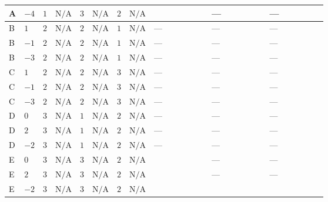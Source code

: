 \documentclass[8pt]{article}
\begin{document}
\begin{landscape}
\begin{longtable}{@{}llcccccc >{\raggedright\arraybackslash}p{0.21\linewidth} >{\raggedright\arraybackslash}p{0.21\linewidth} >{\raggedright\arraybackslash}p{0.21\linewidth}@{}}
\midrule
A & $-4$ & $1$ & $\text{N/A}$ & $3$ & $\text{N/A}$ & $2$ & $\text{N/A}$ & \scriptsize\adjustbox{max width=\linewidth}{$\begin{gathered} +16 {\lambda_{S_2}^{(A)}}^2\end{gathered}$} & --- & --- \\
\midrule
B & $1$ & $2$ & $\text{N/A}$ & $2$ & $\text{N/A}$ & $1$ & $\text{N/A}$ & --- & --- & --- \\
\midrule
B & $-1$ & $2$ & $\text{N/A}$ & $2$ & $\text{N/A}$ & $1$ & $\text{N/A}$ & --- & --- & --- \\
\midrule
B & $-3$ & $2$ & $\text{N/A}$ & $2$ & $\text{N/A}$ & $1$ & $\text{N/A}$ & --- & --- & --- \\
\midrule
C & $1$ & $2$ & $\text{N/A}$ & $2$ & $\text{N/A}$ & $3$ & $\text{N/A}$ & --- & --- & --- \\
\midrule
C & $-1$ & $2$ & $\text{N/A}$ & $2$ & $\text{N/A}$ & $3$ & $\text{N/A}$ & --- & --- & --- \\
\midrule
C & $-3$ & $2$ & $\text{N/A}$ & $2$ & $\text{N/A}$ & $3$ & $\text{N/A}$ & --- & --- & --- \\
\midrule
D & $0$ & $3$ & $\text{N/A}$ & $1$ & $\text{N/A}$ & $2$ & $\text{N/A}$ & --- & --- & --- \\
\midrule
D & $2$ & $3$ & $\text{N/A}$ & $1$ & $\text{N/A}$ & $2$ & $\text{N/A}$ & --- & --- & --- \\
\midrule
D & $-2$ & $3$ & $\text{N/A}$ & $1$ & $\text{N/A}$ & $2$ & $\text{N/A}$ & --- & --- & --- \\
\midrule
E & $0$ & $3$ & $\text{N/A}$ & $3$ & $\text{N/A}$ & $2$ & $\text{N/A}$ & \scriptsize\adjustbox{max width=\linewidth}{$\begin{gathered} +16 {\lambda_{S_2}^{(A)}}^2\end{gathered}$} & --- & --- \\
\midrule
E & $2$ & $3$ & $\text{N/A}$ & $3$ & $\text{N/A}$ & $2$ & $\text{N/A}$ & \scriptsize\adjustbox{max width=\linewidth}{$\begin{gathered} +16 {\lambda_{S_2}^{(A)}}^2\end{gathered}$} & --- & --- \\
\midrule
E & $-2$ & $3$ & $\text{N/A}$ & $3$ & $\text{N/A}$ & $2$ & $\text{N/A}$ & \scriptsize\adjustbox{max width=\linewidth}{$\begin{gathered} +16 {\lambda_{S_2}^{(A)}}^2\end{gathered}$} & \scriptsize\adjustbox{max width=\linewidth}{$\begin{gathered} \frac{832}{3} {\lambda_{X_{1}}} \left({\lambda_{X_{1}}}\right)^{*}\end{gathered}$} & \scriptsize\adjustbox{max width=\linewidth}{$\begin{gathered} +\frac{352}{3} {\lambda_{X_{2}}} \left({\lambda_{X_{2}}}\right)^{*}\end{gathered}$} \\

\end{longtable}
\end{landscape}
\end{document}
